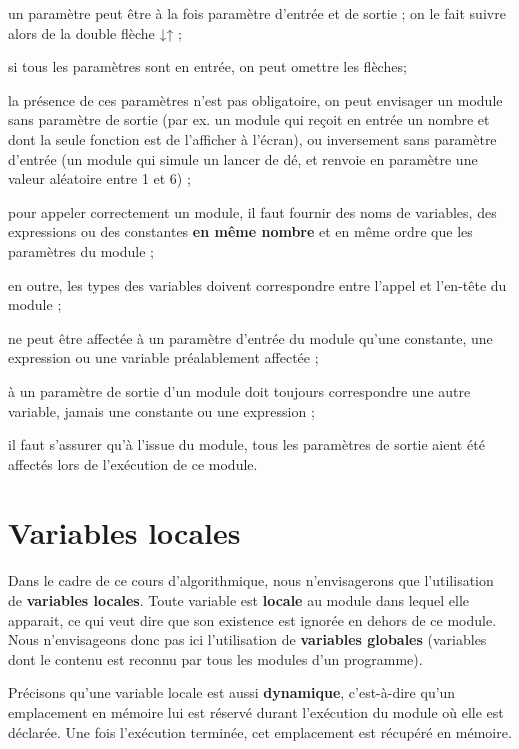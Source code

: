 	\begin{liste}
	\item {
	{un paramètre peut être à la fois paramètre
	d’entrée et de sortie ; on le fait suivre alors de la double flèche
	}{↓↑}{ ;}}
	\item {
	si tous les paramètres sont en entrée, on peut omettre les flèches;}
	\item {
	la présence de ces paramètres n’est pas obligatoire, on peut envisager
	un module sans paramètre de sortie (par ex. un module qui reçoit en
	entrée un nombre et dont la seule fonction est de l’afficher à
	l’écran), ou inversement sans paramètre d’entrée (un module qui simule
	un lancer de dé, et renvoie en paramètre une valeur aléatoire entre 1
	et 6) ;}
	\item {
	{pour appeler correctement un module, il faut
	fournir des noms de variables, des expressions ou des constantes
	}{\textbf{en même
	nombre}}{ et en même ordre que les paramètres
	du module ;}}
	\item {
	en outre, les types des variables doivent correspondre entre l’appel et
	l’en-tête du module ;}
	\item {
	ne peut être affectée à un paramètre d’entrée du module qu’une
	constante, une expression ou une variable préalablement affectée ;}
	\item {
	à un paramètre de sortie d’un module doit toujours correspondre une
	autre variable, jamais une constante ou une expression ;}
	\item {
	il faut s’assurer qu’à l’issue du module, tous les paramètres de sortie
	aient été affectés lors de l’exécution de ce module.}
	\end{liste}

\section{Variables locales}

	Dans le cadre de ce cours d’algorithmique,
	nous n’envisagerons que l’utilisation de 
	\textbf{variables locales}. 
	Toute variable est \textbf{locale} au module 
	dans lequel elle apparait, ce qui veut dire que son existence
	est ignorée en dehors de ce module. 
	Nous n’envisageons donc pas ici l’utilisation de 
	\textbf{variables globales} 
	(variables dont le contenu est reconnu 
	par tous les modules d’un programme).

	Précisons qu'une variable locale est aussi
	\textbf{dynamique}, c’est-à-dire qu’un emplacement en mémoire lui est
	réservé durant l’exécution du module où elle est déclarée. Une fois
	l’exécution terminée, cet emplacement est récupéré en mémoire.

